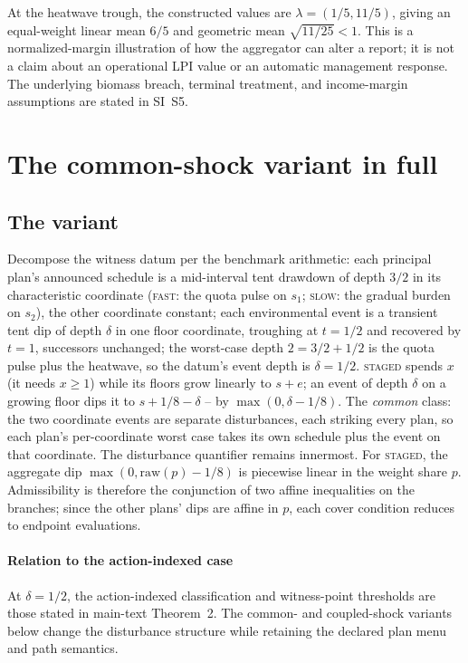 \documentclass[preprint,11pt,authoryear]{elsarticle}
\theoremstyle{remark}
\newcommand{\act}[1]{\textsc{#1}}
\begin{document}
At the heatwave trough, the constructed values are $\lambda=(1/5,11/5)$, giving an equal-weight linear mean $6/5$ and geometric mean $\sqrt{11/25}<1$. This is a normalized-margin illustration of how the aggregator can alter a report; it is not a claim about an operational LPI value or an automatic management response. The underlying biomass breach, terminal treatment, and income-margin assumptions are stated in SI~S5.

\section{The common-shock variant in full}\label{si:commonshock}

\subsection{The variant}

Decompose the witness datum per the benchmark arithmetic: each principal plan's announced schedule is a mid-interval tent drawdown of depth $3/2$ in its characteristic coordinate (\act{fast}: the quota pulse on $s_1$; \act{slow}: the gradual burden on $s_2$), the other coordinate constant; each environmental event is a transient tent dip of depth $\delta$ in one floor coordinate, troughing at $t=1/2$ and recovered by $t=1$, successors unchanged; the worst-case depth $2=3/2+1/2$ is the quota pulse plus the heatwave, so the datum's event depth is $\delta=1/2$. \act{staged} spends $x$ (it needs $x\ge1$) while its floors grow linearly to $s+e$; an event of depth $\delta$ on a growing floor dips it to $s+1/8-\delta$ -- by $\max(0,\delta-1/8)$. The \emph{common} class: the two coordinate events are separate disturbances, each striking every plan, so each plan's per-coordinate worst case takes its own schedule plus the event on that coordinate. The disturbance quantifier remains innermost. For \act{staged}, the aggregate dip $\max(0,\mathrm{raw}(p)-1/8)$ is piecewise linear in the weight share $p$. Admissibility is therefore the conjunction of two affine inequalities on the branches; since the other plans' dips are affine in $p$, each cover condition reduces to endpoint evaluations.

\paragraph{Relation to the action-indexed case} At $\delta=1/2$, the action-indexed classification and witness-point thresholds are those stated in main-text Theorem~2. The common- and coupled-shock variants below change the disturbance structure while retaining the declared plan menu and path semantics.
\end{document}
